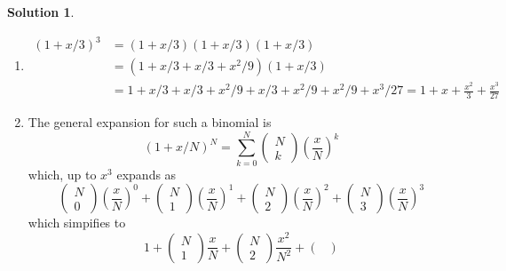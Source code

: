 \documentclass[10pt]{article}
\theoremstyle{definition}
\newtheorem{soln}{Solution}
\begin{document}
\begin{soln}
  \begin{enumerate}[label=(\alph*)]
    \item \begin{align*}
            \left(1+x/3\right)^3 & =\left(1+x/3\right)\left(1+x/3\right)\left(1+x/3\right)                  \\
                                 & =\left(1+x/3+x/3+x^2/9\right)\left(1+x/3\right)                          \\
                                 & =1+x/3+x/3+x^2/9+x/3+x^2/9+x^2/9+x^3/27=1+x+\frac{x^2}{3}+\frac{x^3}{27}
          \end{align*}
    \item The general expansion for such a binomial is
          $$(1+x/N)^N=\sum_{k=0}^N\begin{pmatrix}
              N \\
              k
            \end{pmatrix}\left(\frac{x}{N}\right)^k$$
          which, up to $x^3$ expands as
          $$
            \begin{pmatrix}
              N \\
              0
            \end{pmatrix}\left(\frac{x}{N}\right)^0
            +
            \begin{pmatrix}
              N \\
              1
            \end{pmatrix}\left(\frac{x}{N}\right)^1+
            \begin{pmatrix}
              N \\
              2
            \end{pmatrix}\left(\frac{x}{N}\right)^2+
            \begin{pmatrix}
              N \\
              3
            \end{pmatrix}\left(\frac{x}{N}\right)^3
          $$
          which simpifies to
          $$
            1
            +
            \begin{pmatrix}
              N \\
              1
            \end{pmatrix}\frac{x}{N}+
            \begin{pmatrix}
              N \\
              2
            \end{pmatrix}\frac{x^2}{N^2}+
            \begin{pmatrix}

\end{pmatrix}$$
\end{enumerate}
\end{soln}
\end{document}
